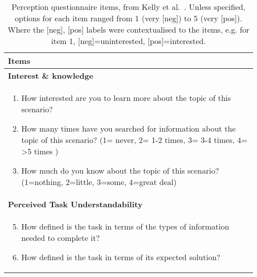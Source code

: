 \documentclass[sigconf]{acmart}
\begin{document}

 

\appendix
\begin{table}[tb]
	\centering
	\small
	\caption{Perception questionnaire items, from Kelly et al.~\citep{Kelly2015}. Unless specified, options for each item ranged from 1 (very [neg]) to 5 (very [pos]). Where the [neg], [pos] labels were contextualised to the items, e.g. for item 1, [neg]=uninterested, [pos]=interested.}\label{table: pre questionnaire}
	\vspace{-10px}
	\begin{tabular}{p{8cm}}
		\toprule
		\textbf{Items}  \\
		\toprule
		
		\textbf{Interest \& knowledge} \\
		\begin{enumerate}[leftmargin=*,  topsep=0pt, labelsep=1pt]
			\item How interested are you to learn more about the topic of this scenario?
			\item How many times have you searched for information about the topic of this scenario? (1= never, 2= 1-2 times, 3= 3-4 times, 4= >5 times )
			\item How much do you know about the topic of this scenario? (1=nothing, 2=little, 3=some, 4=great deal)
		\end{enumerate} \\
		
		\toprule
		\textbf{Perceived Task Understandability} \\
		\begin{enumerate}[leftmargin=*,  topsep=0pt, labelsep=1pt]
			\setcounter{enumi}{4}
			\item How defined is the task in terms of the types of information needed to complete it?
			\item How defined is the task in terms of its expected solution?
		\end{enumerate} \\
		\bottomrule
	\end{tabular} 
\end{table}
\end{document}

